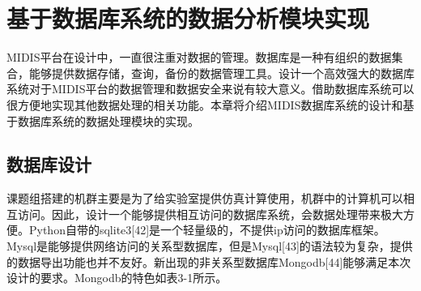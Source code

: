 \newpage

\section{基于数据库系统的数据分析模块实现}

MIDIS平台在设计中，一直很注重对数据的管理。数据库是一种有组织的数据集合，能够提供数据存储，查询，备份的数据管理工具。设计一个高效强大的数据库系统对于MIDIS平台的数据管理和数据安全来说有较大意义。借助数据库系统可以很方便地实现其他数据处理的相关功能。本章将介绍MIDIS数据库系统的设计和基于数据库系统的数据处理模块的实现。

\subsection{数据库设计}

课题组搭建的机群主要是为了给实验室提供仿真计算使用，机群中的计算机可以相互访问。因此，设计一个能够提供相互访问的数据库系统，会数据处理带来极大方便。Python自带的sqlite3[42]是一个轻量级的，不提供ip访问的数据库框架。Mysql是能够提供网络访问的关系型数据库，但是Mysql[43]的语法较为复杂，提供的数据导出功能也并不友好。新出现的非关系型数据库Mongodb[44]能够满足本次设计的要求。Mongodb的特色如表3-1所示。
